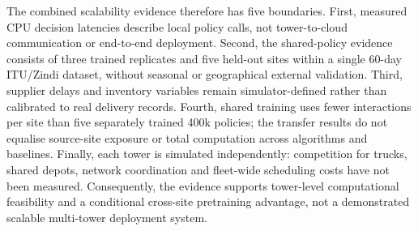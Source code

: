 \begin{revisedblock}
The combined scalability evidence therefore has five boundaries.
First, measured CPU decision latencies describe local policy calls,
not tower-to-cloud communication or end-to-end deployment.
Second, the shared-policy evidence consists of three trained
replicates and five held-out sites within a single 60-day
ITU/Zindi dataset, without seasonal or geographical external
validation. Third, supplier delays and inventory variables remain
simulator-defined rather than calibrated to real delivery records.
Fourth, shared training uses fewer interactions per site than
five separately trained 400k policies; the transfer results do
not equalise source-site exposure or total computation across
algorithms and baselines. Finally, each tower is simulated
independently: competition for trucks, shared depots, network
coordination and fleet-wide scheduling costs have not been measured.
Consequently, the evidence supports tower-level computational
feasibility and a conditional cross-site pretraining advantage,
not a demonstrated scalable multi-tower deployment system.
\end{revisedblock}


